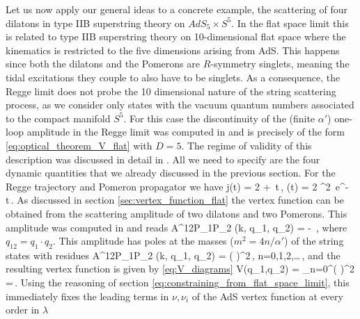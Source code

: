 Let us now apply our general ideas to a concrete example, the scattering of four dilatons in type IIB superstring theory on $AdS_5 \times S^5$. In the flat space limit this is related to
type IIB superstring theory on 10-dimensional flat space where the kinematics is restricted to the five dimensions arising from AdS. This happens since both the dilatons and the Pomerons are $R$-symmetry singlets, meaning the tidal excitations they couple to also have to be singlets.
As a consequence, the Regge limit does not probe the 10 dimensional nature of the string scattering process, as we consider only states with the vacuum quantum numbers associated to the compact manifold $S^5$.
 For this case the discontinuity of the (finite $\alpha'$) one-loop amplitude in the Regge limit was computed in \cite{Amati:1987uf} and is precisely of the form \eqref{eq:optical_theorem_V_flat} with $D=5$. The regime of validity of this description was discussed in detail in \cite{Amati:1987uf}.
All we need to specify are the four dynamic quantities that we already discussed in the previous section. For the Regge trajectory and Pomeron propagator we have
\beq
j(t) = 2 + \,t\,, \qquad
\beta(t) = 2 \pi^2 
		\,e^{-  t}\,.
\eeq
As discussed in section \ref{sec:vertex_function_flat} the vertex function can be obtained from the scattering amplitude of two dilatons and two Pomerons. This amplitude was computed in 
\cite{Amati:1987uf} and reads
	\beq
		A^{12P_1P_2} (k, q_1, q_2) = - \,,
		\label{eq:Aa1a2}
	\eeq
where $q_{12} = q_1\cdot q_2$.
This amplitude has poles at the masses ($m^2=4n/\alpha'$) of the string states with residues
	\beq
		 A^{12P_1P_2} (k, q_1, q_2)
		= \left(  \right)^2\,, \qquad n=0,1,2,\ldots\,,
		\label{eq:3pt_A_calculated}
	\eeq
and the resulting vertex function is given by \eqref{eq:V_diagrams}
\beq
V(q_1,q_2) = 
\sum\limits_{n=0}^\infty \left(  \right)^2
=\,.
\label{eq:V_flat}
\eeq
Using the reasoning of section \ref{eq:constraining_from_flat_space_limit}, this immediately fixes the leading terms in $\nu, \nu_i$ of the AdS vertex function at every order in $\lambda$

